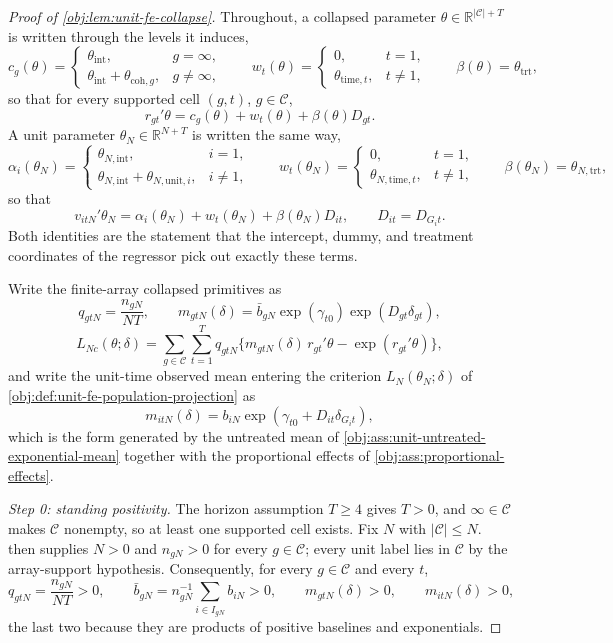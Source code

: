 \documentclass[11pt]{article}
\begin{document}
\begin{proof}[Proof of \cref{obj:lem:unit-fe-collapse}]
Throughout, a collapsed parameter \(\theta\in\mathbb R^{|\mathcal C|+T}\) is written through the levels it induces,
\[
c_g(\theta)=
\begin{cases}
\theta_{\text{int}}, & g=\infty,\\
\theta_{\text{int}}+\theta_{\text{coh},g}, & g\neq\infty,
\end{cases}
\qquad
w_t(\theta)=
\begin{cases}
0, & t=1,\\
\theta_{\text{time},t}, & t\neq1,
\end{cases}
\qquad
\beta(\theta)=\theta_{\text{trt}},
\]
so that for every supported cell \((g,t)\), \(g\in\mathcal C\),
\[
r_{gt}'\theta=c_g(\theta)+w_t(\theta)+\beta(\theta)D_{gt}.
\]
A unit parameter \(\theta_N\in\mathbb R^{N+T}\) is written the same way,
\[
\alpha_i(\theta_N)=
\begin{cases}
\theta_{N,\text{int}}, & i=1,\\
\theta_{N,\text{int}}+\theta_{N,\text{unit},i}, & i\neq1,
\end{cases}
\qquad
w_t(\theta_N)=
\begin{cases}
0, & t=1,\\
\theta_{N,\text{time},t}, & t\neq1,
\end{cases}
\qquad
\beta(\theta_N)=\theta_{N,\text{trt}},
\]
so that
\[
v_{itN}'\theta_N=\alpha_i(\theta_N)+w_t(\theta_N)+\beta(\theta_N)D_{it},
\qquad D_{it}=D_{G_it}.
\]
Both identities are the statement that the intercept, dummy, and treatment coordinates of the regressor pick out exactly these terms.

Write the finite-array collapsed primitives as
\[
q_{gtN}=\frac{n_{gN}}{NT},
\qquad
m_{gtN}(\delta)=\bar b_{gN}\exp(\gamma_{t0})\exp(D_{gt}\delta_{gt}),
\]
\[
L_{Nc}(\theta;\delta)
=
\sum_{g\in\mathcal C}\sum_{t=1}^T q_{gtN}\{m_{gtN}(\delta)\,r_{gt}'\theta-\exp(r_{gt}'\theta)\},
\]
and write the unit-time observed mean entering the criterion \(L_N(\theta_N;\delta)\) of \cref{obj:def:unit-fe-population-projection} as
\[
m_{itN}(\delta)=b_{iN}\exp(\gamma_{t0}+D_{it}\delta_{G_it}),
\]
which is the form generated by the untreated mean of \cref{obj:ass:unit-untreated-exponential-mean} together with the proportional effects of \cref{obj:ass:proportional-effects}.

\textit{Step 0: standing positivity.} The horizon assumption \(T\ge4\) gives \(T>0\), and \(\infty\in\mathcal C\) makes \(\mathcal C\) nonempty, so at least one supported cell exists. Fix \(N\) with \(|\mathcal C|\le N\).  then supplies \(N>0\) and \(n_{gN}>0\) for every \(g\in\mathcal C\); every unit label lies in \(\mathcal C\) by the array-support hypothesis. Consequently, for every \(g\in\mathcal C\) and every \(t\),
\[
q_{gtN}=\frac{n_{gN}}{NT}>0,
\qquad
\bar b_{gN}=n_{gN}^{-1}\sum_{i\in I_{gN}}b_{iN}>0,
\qquad
m_{gtN}(\delta)>0,
\qquad
m_{itN}(\delta)>0 ,
\]
the last two because they are products of positive baselines and exponentials.


\end{proof}
\end{document}
